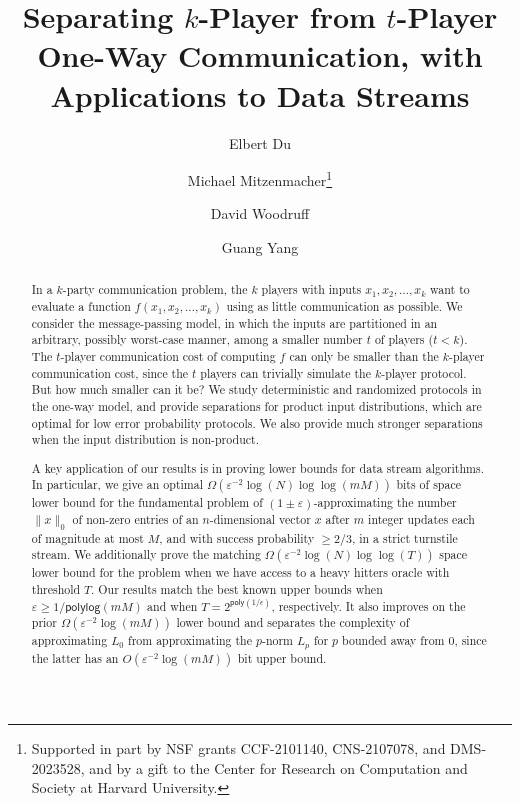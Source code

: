 \documentclass{toc}
\newcommand{\poly}{\mathsf{poly}}
\newcommand{\polylog}{\ensuremath{\mathsf{polylog}}}
\newcommand{\gap}{\ensuremath{\varepsilon}}
\begin{document}
\begin{frontmatter}%

%
%
%

%
%

%
%

  \title{Separating $k$-Player from $t$-Player One-Way Communication, with Applications to Data Streams}

%
%
%
%
%
%
%
%
%
%
%
%


%
%
%
%

%
\author[du]{Elbert Du}
\author[mitzenmacher]{Michael Mitzenmacher\thanks{Supported in part by NSF grants CCF-2101140, CNS-2107078, and DMS-2023528, and by a gift to the Center for Research on Computation and Society at Harvard University.}}
\author[woodruff]{David Woodruff}
\author[yang]{Guang Yang}

%
%
%
%

%
%
%
%
%
%
\begin{abstract}
In a $k$-party communication problem, the $k$ players with
%
%
inputs $x_1, x_2, \ldots, x_k$ %
want to evaluate a function $f(x_1, x_2, \ldots, x_k)$ 
using as little communication as possible. 
We consider the message-passing model, in which the inputs are partitioned in an arbitrary, possibly worst-case manner, among a smaller number $t$ of players ($t<k$). 
The $t$-player communication cost of computing $f$ can only be smaller than the $k$-player communication cost, since the $t$ players can trivially simulate the $k$-player protocol. 
But how much smaller can it be? 
We study deterministic and randomized protocols in the one-way model, and provide separations for product input distributions, which are optimal for low error probability protocols. We also provide much stronger separations when the input distribution is non-product.  

A key application of our results is in proving lower bounds for data stream algorithms. In particular, we give an optimal $\Omega(\gap^{-2}\log(N) \log \log(mM))$ bits of space lower bound for the fundamental problem of $(1\pm\gap)$-approximating the number $\|x\|_0$ of non-zero entries of an $n$-dimensional vector $x$ after $m$ integer updates each of magnitude at most $M$, and with success probability $\ge 2/3$, in a strict turnstile stream. We additionally prove the matching $\Omega(\gap^{-2}\log(N) \log \log(T))$ space lower bound for the problem when we have access to a heavy hitters oracle with threshold $T$.
Our results match the best known upper bounds when $\gap\ge 1/\polylog(mM)$ and when $T = 2^{\poly(1/\epsilon)}$, respectively. %
It also improves on the prior $\Omega(\gap^{-2}\log(mM) )$ lower bound 
and separates the complexity of approximating $L_0$ from approximating the $p$-norm $L_p$ for $p$ bounded away from $0$, since the latter has an $O(\gap^{-2}\log (mM))$ bit upper bound. 
\end{abstract}


\end{frontmatter}
\end{document}
